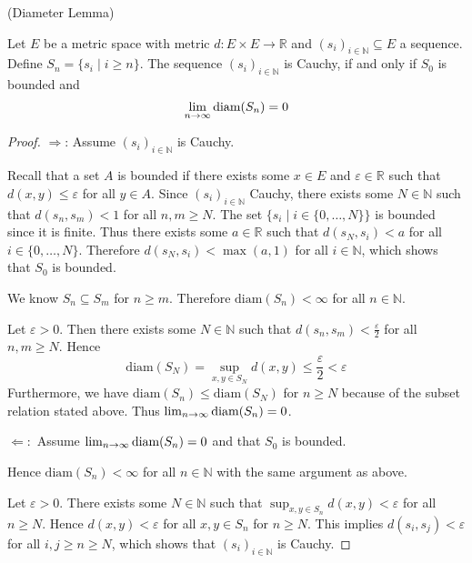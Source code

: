 \begin{lemma} (Diameter Lemma)\par
	Let $E$ be a metric space with metric $d : E \times E \rightarrow \mathbb{R}$ and $(s_i)_{i\in\mathbb{N}} \subseteq E$ a sequence. Define $S_n = \{s_i \; \vert \; i \ge n \}$. The sequence $(s_i)_{i\in\mathbb{N}}$ is Cauchy, if and only if $S_0$ is bounded and
	\[
		\lim_{n \to \infty} \textup{diam}(S_n) = 0
	\]
\end{lemma}
\begin{proof}
\;\newline
$\Longrightarrow$: Assume $(s_i)_{i\in\mathbb{N}}$ is Cauchy. 

Recall that a set $A$ is bounded if there exists some $x \in E$ and $\varepsilon \in \mathbb{R}$ such that $d(x,y) \le \varepsilon$ for all $y \in A$. Since $(s_i)_{i\in\mathbb{N}}$ Cauchy, there exists some $N \in \mathbb{N}$ such that $d(s_n,s_m) < 1$ for all $n, m \ge N$. The set $\{s_i \; \vert \; i \in \{0,\dots,N\}\}$ is bounded since it is finite. Thus there exists some $a \in \mathbb{R}$ such that $d(s_N, s_i) < a$ for all $i \in \{0,\dots,N\}$. Therefore $d(s_N, s_i) < \max(a,1)$ for all $i \in \mathbb{N}$, which shows that $S_0$ is bounded. 

We know $S_n \subseteq S_m$ for $n \ge m$. Therefore $\textrm{diam}(S_n) < \infty$ for all $n \in \mathbb{N}$.

Let $\varepsilon > 0$. Then there exists some $N \in \mathbb{N}$ such that $d(s_n,s_m) < \frac{\varepsilon}{2}$ for all $n, m \ge N$. Hence
\[
	\textrm{diam}(S_N) = \sup_{x,y \in S_N} d(x,y) \le \frac{\varepsilon}{2} < \varepsilon
\]
Furthermore, we have $\textrm{diam}(S_n) \le \textrm{diam}(S_N)$ for $n \ge N$ because of the subset relation stated above. Thus $\lim_{n \to \infty} \textup{diam}(S_n) = 0$.
\vspace{0.2cm}\par\noindent
\noindent$\Longleftarrow:$ Assume $\lim_{n \to \infty} \textup{diam}(S_n) = 0$ and that $S_0$ is bounded. 

Hence $\textrm{diam}(S_n) < \infty$ for all $n \in \mathbb{N}$ with the same argument as above. 

Let $\varepsilon > 0$. There exists some $N \in \mathbb{N}$ such that $\sup_{x,y \in S_n} d(x,y) < \varepsilon$ for all $n \ge N$. Hence $d(x,y) < \varepsilon$ for all $x, y \in S_n$ for $n \ge N$. This implies $d(s_i,s_j) < \varepsilon$ for all $i, j \ge n \ge N$, which shows that $(s_i)_{i\in\mathbb{N}}$ is Cauchy.
\end{proof}

